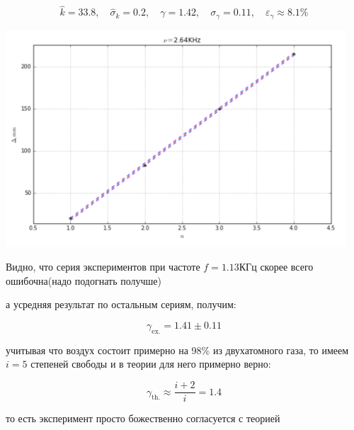 \documentclass[12pt]{article}
\begin{document}
\begin{enumerate}
\begin{itemize}
        \begin{equation}
            \hat{k} = 33.8 ,\quad \hat{\sigma}_k = 0.2, \quad \gamma = 1.42, \quad \sigma_\gamma = 0.11, \quad \varepsilon_\gamma \approx 8.1\%
        \end{equation}

        \begin{center} 
            \includegraphics[width=5in]{2ex.png}
        \end{center}

    \end{itemize}

    \end{enumerate}

    Видно, что серия экспериментов при частоте $f = 1.13\text{КГц}$ скорее всего ошибочна(надо подогнать получше)

    а усредняя результат по остальным сериям, получим:

    \begin{equation}
        \gamma_\text{ex.} = 1.41 \pm 0.11 
    \end{equation}

    учитывая что воздух состоит примерно на 98\% из двухатомного газа, то имеем $i = 5$ степеней свободы и в теории для него примерно верно:

    \begin{equation}
        \gamma_\text{th.} \approx \frac{i+2}{i} = 1.4
    \end{equation}

    то есть эксперимент просто божественно согласуется с теорией
\end{document}
